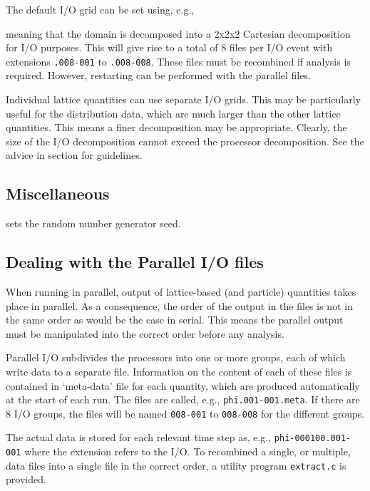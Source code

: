 The default I/O grid can be set using, e.g.,


meaning that the domain is decomposed into a 2x2x2 Cartesian
decomposition for I/O purposes. This will give rise to a total
of 8 files per I/O event with extensions \texttt{.008-001} to
\texttt{.008-008}. These files must be recombined if analysis
is required. However, restarting can be performed with the
parallel files.

Individual lattice quantities can use separate I/O grids. This
may be particularly useful for the distribution data, which are
much larger than the other lattice quantities. This means a
finer decomposition may be appropriate. Clearly, the size of the
I/O decomposition cannot exceed the processor decomposition.
See the advice in section \cite{section-advice} for guidelines.



\subsection{Miscellaneous}


sets the random number generator seed.

\subsection{Dealing with the Parallel I/O files}

When running in parallel, output of lattice-based (and particle)
quantities takes place in parallel. As a consequence, the order
of the output in the files is not in the same order as would be
the case in serial. This means the parallel output must be
manipulated into the correct order before any analysis.

Parallel I/O subdivides the processors into one or more groups,
each of which write data to a separate file. Information on the
content of each of these files is contained in `meta-data' file
for each quantity, which are produced automatically at the start
of each run. The files are called, e.g., \texttt{phi.001-001.meta}.
If there are 8 I/O groups, the files will be named \texttt{008-001}
to \texttt{008-008} for the different groups.

The actual data is stored for each relevant time step as, e.g.,
\texttt{phi-000100.001-001} where the extension refers to the
I/O. To recombined a single, or multiple, data files into a
single file in the correct order, a utility program
\texttt{extract.c} is provided.

